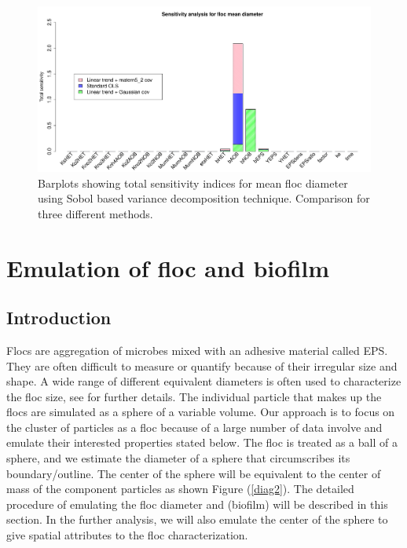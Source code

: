 \documentclass[12pt,titlepage]{report}
\theoremstyle{definition}
\theoremstyle{remark}
\begin{document}
\begin{figure}[!ht] 
\includegraphics[width=1.1\textwidth]{ana/sensitivty_results}
\caption[]{Barplots showing total sensitivity indices for mean floc diameter using Sobol based variance decomposition technique. Comparison for three different methods.}\label{sens}
\end{figure}


\chapter{Emulation of floc and biofilm}
\section{Introduction}
 Flocs are aggregation of microbes mixed with an adhesive material called EPS. They are often difficult to measure or quantify because of their irregular size and shape.  A wide range of different equivalent diameters is often used to characterize the floc size, see \citet{l3} for further details. The individual particle that makes up the flocs are simulated as a sphere of a variable volume. 
Our approach is to focus on the cluster of particles as a floc because of a large number of data involve and emulate their interested properties stated below.  The floc is treated as a ball of a sphere, and we estimate the diameter of a sphere that circumscribes its boundary/outline. The center of the sphere will be equivalent to the center of mass of the component particles as shown Figure (\ref{diag2}). The detailed procedure of emulating the floc diameter and (biofilm) will be described in this section. In the further analysis, we will also emulate the center of the sphere to give spatial attributes to the floc characterization.
\end{document}
